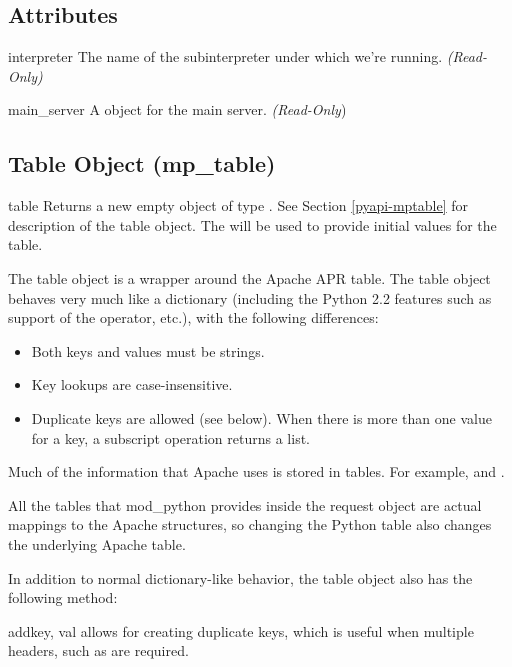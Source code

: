 \subsection{Attributes\label{pyapi-apmem}}

\begin{memberdesc}[apache]{interpreter}
  The name of the subinterpreter under which we're running.
  \emph{(Read-Only)}
\end{memberdesc}

\begin{memberdesc}[apache]{main_server}
  A  object for the main server.
  \emph{(Read-Only})
\end{memberdesc}

\subsection{Table Object (mp_table)\label{pyapi-mptable}}

\begin{classdesc}{table}{}
  Returns a new empty object of type . See Section
  \ref{pyapi-mptable} for description of the table object. The
   will be used to provide initial values for
  the table.  

  The table object is a wrapper around the Apache APR table. The table
  object behaves very much like a dictionary (including the Python 2.2
  features such as support of the  operator, etc.), with the 
  following differences:

  \begin{itemize}
  \item
    Both keys and values must be strings.
  \item
    Key lookups are case-insensitive.
  \item
    Duplicate keys are allowed (see  below). When there is
    more than one value for a key, a subscript operation returns a list.
  \end{itemize}

  Much of the information that Apache uses is stored in tables. For
  example,  and .

  All the tables that mod_python provides inside the request
  object are actual mappings to the Apache structures, so changing the
  Python table also changes the underlying Apache table.

  In addition to normal dictionary-like behavior, the table object also
  has the following method:

  \begin{methoddesc}[table]{add}{key, val}
     allows for creating duplicate keys, which is useful 
    when multiple headers, such as  are required.
  \end{methoddesc}

\end{classdesc}

